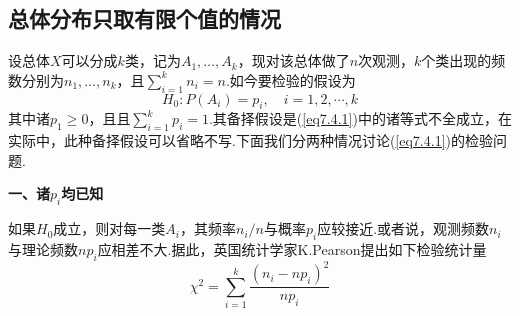 \subsection{总体分布只取有限个值的情况\label{sec:7.3.1}}
设总体$X$可以分成$k$类，记为$A_{1},\dotsc,A_{k}$，现对该总体做了$n$次观测，$k$个类出现的频数分别为$n_{1},\dotsc,n_{k}$，且$\sum _ { i = 1 } ^ { k } n _ { i } = n$.如今要检验的假设为
\begin{equation}\label{eq7.4.1}
H _ { 0 } : P \left( A _ { i } \right) = p _ { i } , \quad i = 1,2 , \cdots , k
\end{equation}
其中诸$p_{1}\geq 0$，且且$\sum _ { i = 1 } ^ { k } p _ { i } = 1$.其备择假设是(\ref{eq7.4.1})中的诸等式不全成立，在实际中，此种备择假设可以省略不写.下面我们分两种情况讨论(\ref{eq7.4.1})的检验问题.

\textbf{一、诸$p_{i}$均已知}

如果$H_{0}$成立，则对每一类$A_{i}$，其频率$n_{i}/n$与概率$p_{i}$应较接近.或者说，观测频数$n_{i}$与理论频数$np_{i}$应相差不大.据此，英国统计学家K.Pearson提出如下检验统计量
\begin{equation}\label{eq7.4.2}
\chi ^ { 2 } = \sum _ { i = 1 } ^ { k } \frac { \left( n _ { i } - n p _ { i } \right) ^ { 2 } } { n p _ { i } }
\end{equation}

